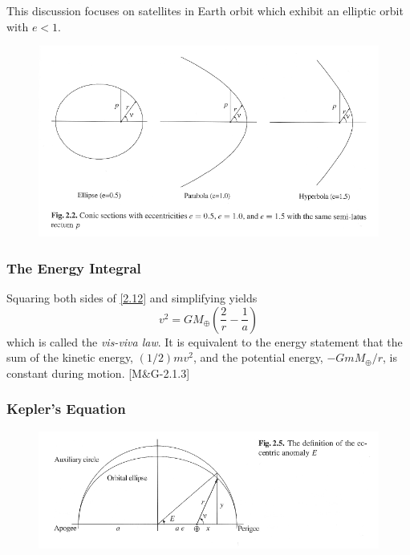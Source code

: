 \documentclass[11pt]{article}
\begin{document}
This discussion focuses on satellites in Earth orbit which exhibit an
elliptic orbit with $e < 1$.

\begin{figure}
  \begin{center}
    \includegraphics{figure-2-2.pdf}
  \end{center}
\end{figure}

\subsubsection{The Energy Integral}

Squaring both sides of \eqref{2.12} and simplifying yields
\begin{equation}
  v^2 = GM_{\oplus}\left(\frac{2}{r} - \frac{1}{a}\right) \label{2.22}\tag{2.22}
\end{equation}
which is called the {\em vis-viva law}. It is equivalent to the energy
statement that the sum of the kinetic energy, $(1/2)mv^2$, and the
potential energy, $-GmM_{\oplus}/r$, is constant during motion. [M\&G-2.1.3]

\subsubsection{Kepler's Equation}

\begin{figure}
  \begin{center}
    \includegraphics{figure-2-5.pdf}
  \end{center}
\end{figure}
\end{document}
